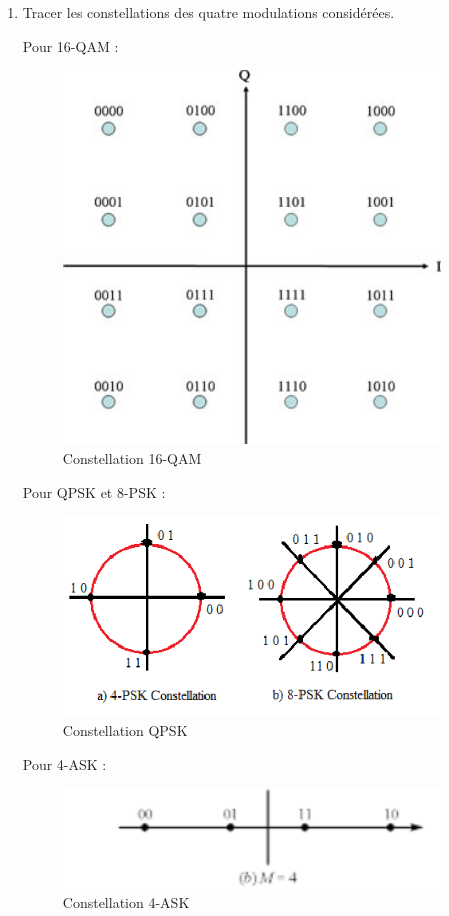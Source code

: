 \documentclass[frenchb]{article}
\begin{document}
\begin{enumerate}
    \item Tracer les constellations des quatre modulations considérées.
    
    Pour 16-QAM : 
    \begin{figure}[ht!]
    		\centering
		\includegraphics[width=10cm]{C16QAM.jpg}		              	 	\caption{Constellation 16-QAM \label{F31}}
	\end{figure}
	\newpage
	Pour QPSK et 8-PSK : 
	\begin{figure}[ht!]
    		\centering
		\includegraphics[width=10cm]{CPSK.png}		              	 	\caption{Constellation QPSK \label{F32}}
	\end{figure}
	
	Pour 4-ASK : 
	\begin{figure}[ht!]
    		\centering
		\includegraphics[width=10cm]{C4ASK.png}		              	 	\caption{Constellation 4-ASK \label{F34}}
	\end{figure}
    

\end{enumerate}
\end{document}
